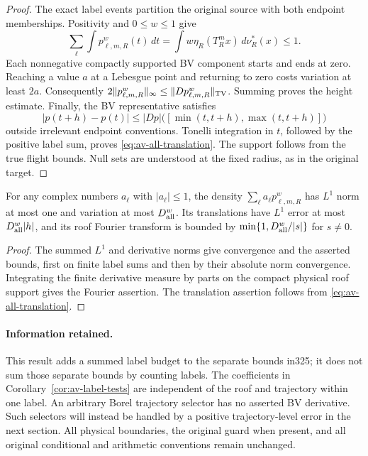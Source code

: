 \begin{proof}
The exact label events partition the original source with both
endpoint memberships.  Positivity and $0\le w\le1$ give
\[
 \sum_\ell\int p^w_{\ell,m,R}(t)\,dt
 =\int w\eta_R(T_R^mx)\,d\nu_R^*(x)\le1.
\]
Each nonnegative compactly supported BV component starts and ends
at zero.  Reaching a value $a$ at a Lebesgue point and returning
to zero costs variation at least $2a$.  Consequently
$2\|p^w_{\ell,m,R}\|_\infty\le\|Dp^w_{\ell,m,R}\|_{\rm TV}$.
Summing proves the height estimate.  Finally, the BV representative
satisfies
\[
 |p(t+h)-p(t)|\le |Dp|\bigl([\min(t,t+h),\max(t,t+h)]\bigr)
\]
outside irrelevant endpoint conventions.  Tonelli integration in
$t$, followed by the positive label sum, proves
\eqref{eq:av-all-translation}.  The support follows from the true
flight bounds.  Null sets are understood at the fixed radius, as in
the original target.
\end{proof}

\begin{corollary}
\label{cor:av-label-tests}
For any complex numbers $a_\ell$ with $|a_\ell|\le1$, the density
$\sum_\ell a_\ell p^w_{\ell,m,R}$ has $L^1$ norm at most one and
variation at most $D_{\rm all}^w$.  Its translations have $L^1$
error at most $D_{\rm all}^w|h|$, and its roof Fourier transform is
bounded by $\min\{1,D_{\rm all}^w/|s|\}$ for $s\ne0$.
\end{corollary}
\begin{proof}
The summed $L^1$ and derivative norms give convergence and the
asserted bounds, first on finite label sums and then by their
absolute norm convergence.  Integrating the finite derivative
measure by parts on the compact physical roof support gives the
Fourier assertion.  The translation assertion follows from
\eqref{eq:av-all-translation}.
\end{proof}

\paragraph{Information retained.}
This result adds a summed label budget to the separate bounds in325;
it does not sum those separate bounds by counting labels.  The
coefficients in Corollary~\ref{cor:av-label-tests} are independent
of the roof and trajectory within one label.  An arbitrary Borel
trajectory selector has no asserted BV derivative.  Such selectors
will instead be handled by a positive trajectory-level error in the
next section.  All physical boundaries, the original guard when
present, and all original conditional and arithmetic conventions
remain unchanged.
